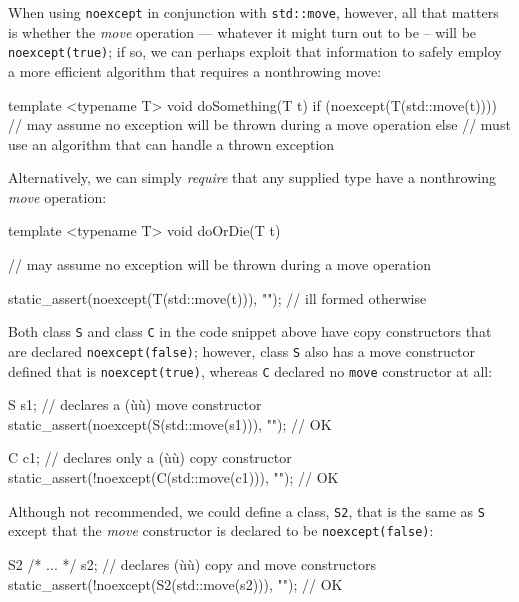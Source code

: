 When using \lstinline!noexcept! in conjunction with \lstinline!std::move!,
however, all that matters is whether the \emph{move} operation ---
whatever it might turn out to be -- will be \lstinline!noexcept(true)!; if
so, we can perhaps exploit that information to safely employ a more
efficient algorithm that requires a nonthrowing move:

\begin{emcppslisting}
template <typename T>
void doSomething(T t)
{
    if (noexcept(T(std::move(t))))
    {
        // may assume no exception will be thrown during a move operation
    }
    else
    {
        // must use an algorithm that can handle a thrown exception
    }
}
\end{emcppslisting}
    

\noindent Alternatively, we can simply \emph{require} that any supplied type have
a nonthrowing \emph{move} operation:

\begin{emcppslisting}
template <typename T>
void doOrDie(T t)
{
    // may assume no exception will be thrown during a move operation

    static_assert(noexcept(T(std::move(t))), "");  // ill formed otherwise
}
\end{emcppslisting}
    

\noindent Both class \lstinline!S! and class \lstinline!C! in the code snippet above
have copy constructors that are declared \lstinline!noexcept(false)!;
however, class \lstinline!S! also has a move constructor defined that is
\lstinline!noexcept(true)!, whereas \lstinline!C! declared no \lstinline!move!
constructor at all:

\begin{emcppslisting}
S s1;  // declares a (ù{}ù) move constructor
static_assert(noexcept(S(std::move(s1))), "");    // OK

C c1;  // declares only a (ù{}ù) copy constructor
static_assert(!noexcept(C(std::move(c1))), "");   // OK
\end{emcppslisting}
    

\noindent Although not recommended, we could define a class, \lstinline!S2!, that is
the same as \lstinline!S! except that the \emph{move} constructor is
declared to be \lstinline!noexcept(false)!:

\begin{emcppslisting}
S2 {/* ... */} s2;  // declares (ù{}ù) copy and move constructors
static_assert(!noexcept(S2(std::move(s2))), "");  // OK
\end{emcppslisting}
    

